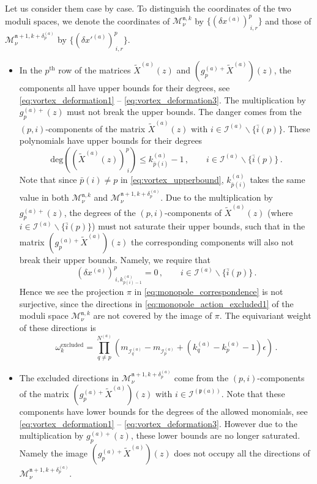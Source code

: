 \documentclass[12pt,a4paper]{article}
\newcommand{\nn}{\mathfrak{n}}
\renewcommand{\(}{\left(}
\renewcommand{\)}{\right)}
\renewcommand{\(}{\left(}
\renewcommand{\)}{\right)}
\begin{document}
Let us consider them case by case. 
To distinguish the coordinates of the two moduli spaces, we denote the coordinates of $ \mathcal{M}_\nu^{\nn,k} $ by $\{(\delta x^{(a)})^p_{\ i,r}\}$ and those of $\mathcal{M}_\nu^{\nn+1,k+\delta^{(a)}_{p}}$ by $\{(\delta {x'}^{(a)})^p_{\ i,r}\}$.
\begin{itemize}
\item In the $p^{\textrm{th}}$ row of the matrices $\tilde{X}^{(a)}(z)$ and $(g^{(a)+}_p\tilde{X}^{(a)})(z)$, the components all have upper bounds for their degrees, see \eqref{eq:vortex_deformation1} -- \eqref{eq:vortex_deformation3}. 
The multiplication by $g^{(a)+}_p(z)$ must not break the upper bounds.
The danger comes from the $(p,i)$-components of the matrix $\tilde{X}^{(a)}(z)$ with $i\in\mathcal{I}^{(a)}\backslash\{\bar{i}(p)\}$. 
These polynomials have upper bounds for their degrees
\begin{equation}\label{eq:vortex_upperbound}
\mathrm{deg}((\tilde{X}^{(a)}(z))^p_{\ i})\leq k^{(a)}_{\bar{p}(i)}-1\,,\qquad i\in\mathcal{I}^{(a)}\backslash\{\bar{i}(p)\}\,.
\end{equation}
Note that since $\bar{p}(i)\neq p$ in \eqref{eq:vortex_upperbound}, $k^{(a)}_{\bar{p}(i)}$ takes the same value in both $\mathcal{M}_\nu^{\nn,k}$ and $\mathcal{M}_\nu^{\nn+1,k+\delta^{(a)}_{p}}$. 
Due to the multiplication by $g^{(a)+}_p(z)$, the degrees of the $(p,i)$-components of $\tilde{X}^{(a)}(z)$ (where $i\in\mathcal{I}^{(a)}\backslash\{\bar{i}(p)\}$) must not saturate their upper bounds, such that in the matrix $(g^{(a)+}_p\tilde{X}^{(a)})(z)$ the corresponding components will also not break their upper bounds.
Namely, we require that
\begin{equation}\label{eq:monopole_action_excluded1}
(\delta x^{(a)})^p_{\ i,k^{(a)}_{\bar{p}(i)-1}}=0\,,\qquad i\in\mathcal{I}^{(a)}\backslash\{\bar{i}(p)\}\,.
\end{equation} 
Hence we see the projection $\pi$ in \eqref{eq:monopole_correspondence} is not surjective, since the directions in \eqref{eq:monopole_action_excluded1} of the moduli space $\mathcal{M}^{\nn,k}_{\nu}$ are not covered by the image of $\pi$. 
The equivariant weight of these directions is
\begin{equation}\label{eq:excluded_weight1}
\omega^{\textrm{excluded}}_{k}=\prod_{q\neq p}^{N^{(a)}}(m_{\mathcal{I}^{(a)}_{q}}-m_{\mathcal{I}^{(a)}_{p}}+(k^{(a)}_{q}-k^{(a)}_{p}-1)\epsilon)\,.
\end{equation}
\item The excluded directions in {\small $\mathcal{M}_\nu^{\nn+1,k+\delta^{(a)}_p}$} come from the $(p,i)$-components of the matrix $(g^{(a)+}_p\tilde{X}^{(a)})(z)$ with $i\in\mathcal{I}^{(\mathfrak{p}(a))}$. Note that these components have lower bounds for the degrees of the allowed monomials, see \eqref{eq:vortex_deformation1} -- \eqref{eq:vortex_deformation3}. 
However due to the multiplication by $g^{(a)+}_p(z)$, these lower bounds are no longer saturated. 
Namely the image $(g^{(a)+}_p\tilde{X}^{(a)})(z)$ does not occupy all the directions of $\mathcal{M}_\nu^{\nn+1,k+\delta^{(a)}_{p}}$. 
    

\end{itemize}
\end{document}
